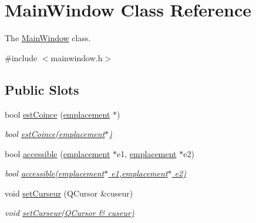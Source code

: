 \hypertarget{classMainWindow}{\section{Main\-Window Class Reference}
\label{classMainWindow}
}


The \hyperlink{classMainWindow}{Main\-Window} class.  




{\ttfamily \#include $<$mainwindow.\-h$>$}

\subsection*{Public Slots}
\begin{DoxyCompactItemize}
\item 
bool \hyperlink{classMainWindow_a4ae4ac96dbfdcb80facbf7da0ae3fb5e}{est\-Coince} (\hyperlink{classemplacement}{emplacement} $\ast$)
\begin{DoxyCompactList}\small\item\em bool \hyperlink{classMainWindow_a4ae4ac96dbfdcb80facbf7da0ae3fb5e}{est\-Coince(emplacement$\ast$)} \end{DoxyCompactList}\item 
bool \hyperlink{classMainWindow_ac3a2c00ad936408dce78d15697eeef24}{accessible} (\hyperlink{classemplacement}{emplacement} $\ast$e1, \hyperlink{classemplacement}{emplacement} $\ast$e2)
\begin{DoxyCompactList}\small\item\em bool \hyperlink{classMainWindow_ac3a2c00ad936408dce78d15697eeef24}{accessible(emplacement$\ast$ e1,emplacement$\ast$ e2)} \end{DoxyCompactList}\item 
void \hyperlink{classMainWindow_a8e9fb499b85eef1d31b4caedcdad3424}{set\-Curseur} (Q\-Cursor \&cuseur)
\begin{DoxyCompactList}\small\item\em void \hyperlink{classMainWindow_a8e9fb499b85eef1d31b4caedcdad3424}{set\-Curseur(\-Q\-Cursor \& cuseur)} \end{DoxyCompactList}\end{DoxyCompactItemize}
